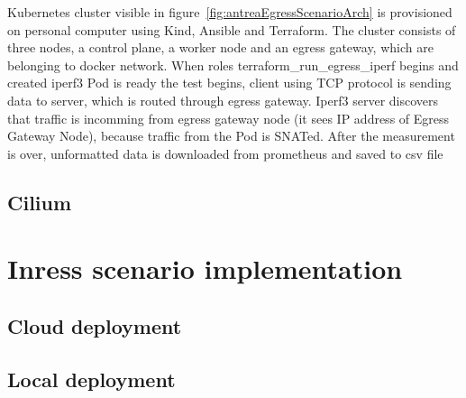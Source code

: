 Kubernetes cluster visible in figure~\ref{fig:antreaEgressScenarioArch} is provisioned on personal computer using Kind, Ansible and Terraform. The cluster consists of three nodes, a control plane, a worker node and an egress gateway, which are belonging to docker network. When roles terraform\_run\_egress\_iperf begins and created iperf3 Pod is ready the test begins, client using TCP protocol is sending data to server, which is routed through egress gateway. Iperf3 server discovers that traffic is incomming from egress gateway node (it sees IP address of Egress Gateway Node), because traffic from the Pod is SNATed. After the measurement is over, unformatted data is downloaded from prometheus and saved to csv file


\subsection{Cilium}
\label{sec:ciliumEgress}


\section{Inress scenario implementation}
\label{sec:ingressImpl}

\subsection{Cloud deployment}
\label{sec:cloudIngressImpl}
\subsection{Local deployment}
\label{sec:localIngressImpl}




